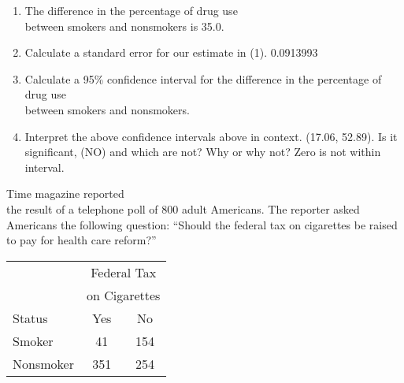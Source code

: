 \documentclass[11pt]{book}\usepackage[]{graphicx}\usepackage[]{color}
\begin{document}
\begin{exercises}
\begin{exercise}
  \end{exercise}
  \begin{solution}  %



\begin{enumerate}
\item The difference in the percentage of drug use \\ between smokers and nonsmokers is 35.0.
\item Calculate a standard error for our estimate in (1).  0.0913993
\item Calculate a 95\% confidence interval for the difference in the percentage of drug use \\ between smokers and nonsmokers.
\item Interpret the above confidence intervals above in context.  (17.06, 52.89). Is it significant, (NO) and which are not? Why or why not? Zero is not within interval.
\end{enumerate}

  \end{solution}

  \begin{exercise} %

Time magazine reported \\ the result of a telephone poll of 800 adult Americans. The reporter asked Americans the following question: ``Should the federal tax on cigarettes be raised to pay for health care reform?''

\begin{table}[ht]
\centering
\begin{tabular}{@{} lcc @{}} \hline
 & \multicolumn{2}{c}{Federal Tax} \\
  & \multicolumn{2}{c}{on Cigarettes} \\
Status & Yes & No \\ \hline
Smoker & 41 & 154 \\
Nonsmoker & 351 & 254 \\ \hline
\end{tabular}
\end{table}


\end{exercise}
\end{exercises}
\end{document}
